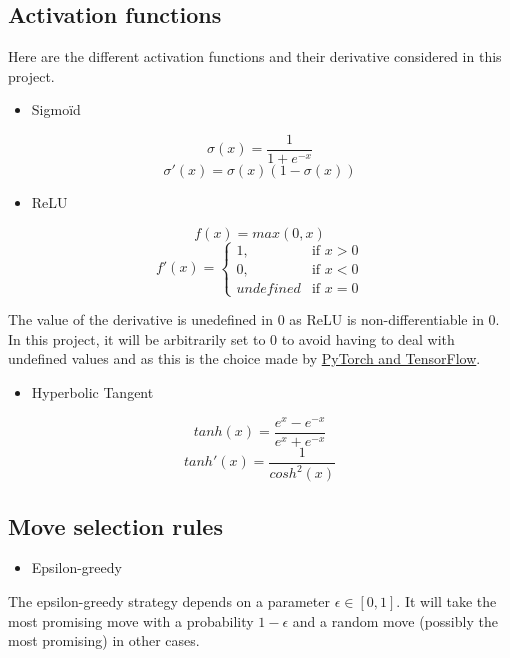 \documentclass{article}
\begin{document}
\subsection{Activation functions}

Here are the different activation functions and their derivative considered in this project.

\begin{itemize}
    \item Sigmoïd
\end{itemize}

$$ \sigma(x) =  \frac{1}{1 + e^{-x}}  $$
$$ \sigma'(x) =  \sigma(x)(1 - \sigma(x))  $$

\begin{itemize}
    \item ReLU
\end{itemize}

$$ f(x) =  max(0, x)  $$
\[
    f'(x)=
\begin{cases}
    1,         & \text{if } x > 0\\
    0,         & \text{if } x < 0\\
    undefined & \text{if } x = 0
\end{cases}
\]

The value of the derivative is unedefined in $0$ as ReLU is non-differentiable in $0$. In this project, it will be arbitrarily set to 0 to avoid having to deal with undefined values and as this is the choice made by \href{https://hal.archives-ouvertes.fr/hal-03265059v2/document\#:~:text=The\%20value\%20of\%20the\%20derivative,the\%20subgradient\%20from\%20convex\%20analysis}{PyTorch and TensorFlow}.

\begin{itemize}
    \item Hyperbolic Tangent
\end{itemize}

$$ tanh(x) =  \frac{e^{x} - e^{-x}}{e^{x} + e^{-x}}  $$
$$ tanh'(x) = \frac{1}{cosh^{2}(x)}  $$

\subsection{Move selection rules}

\begin{itemize}
    \item Epsilon-greedy
\end{itemize}

The epsilon-greedy strategy depends on a parameter $\epsilon \in [0, 1]$. It will take the most promising move with a probability $1 - \epsilon$ and a random move (possibly the most promising) in other cases.
\end{document}
